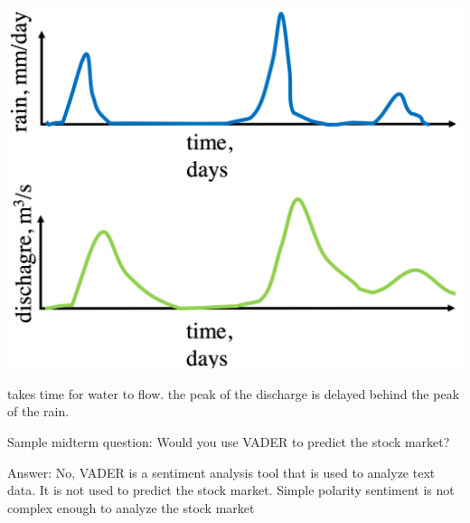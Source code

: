 \documentclass[11pt]{article}
\theoremstyle{definition}
\begin{document}
\includegraphics[width=\textwidth/2]{10.png}

takes time for water to flow. the peak of the discharge is delayed behind the peak of the rain.

Sample midterm question: Would you use VADER to predict the stock market?

Answer: No, VADER is a sentiment analysis tool that is used to analyze text data. It is not used to predict the stock market.
Simple polarity sentiment is not complex enough to analyze the stock market
\end{document}
